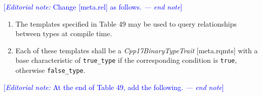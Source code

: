 \documentclass{article}
\begin{document}
\textcolor{blue}{[\textit{Editorial note:} Change [meta.rel] as follows. \textit{--- end note}]}

\begin{enumerate}
\item The templates specified in Table 49 may be used to query
      relationships between types at compile time.

\item Each of these templates shall be a \textit{Cpp17BinaryTypeTrait}
      [meta.rqmts] with a base characteristic of \texttt{true\_type} if
      the corresponding condition is \texttt{true}, otherwise
      \texttt{false\_type}.

\end{enumerate}

\textcolor{blue}{[\textit{Editorial note:} At the end of Table 49, add the following. \textit{--- end note}]}
  
\end{document}
